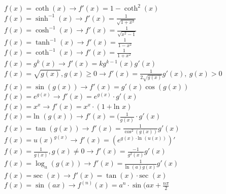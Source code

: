 \documentclass[12pt]{article}
\def\sec{\text{sec\ }} %
\def\ln{\text{ln\ }} %
\begin{document}
\begin{flushleft}
	\textbullet \quad $\displaystyle f(x) = \coth(x) \rightarrow f'(x) = 1-\coth ^2(x) $ \linebreak 
	\textbullet \quad $\displaystyle f(x) = \sinh ^{-1} (x) \rightarrow f'(x) = \frac{1}{\sqrt{1+x^2}} $ \linebreak 
	\textbullet \quad $\displaystyle f(x) = \cosh ^{-1} (x) \rightarrow f'(x) = \frac{1}{\sqrt{x^2 -1}} $ \linebreak 
	\textbullet \quad $\displaystyle f(x) = \tanh ^{-1} (x) \rightarrow f'(x) = \frac{1}{1-x^2} $ \linebreak 
	\textbullet \quad $\displaystyle f(x) = \coth ^{-1} (x) \rightarrow f'(x) = \frac{1}{1+x^2} $ \linebreak 
	\textbullet \quad $\displaystyle f(x) = g^k(x) \rightarrow f'(x) = k g^{k-1}(x) g'(x)$ \linebreak 
	\textbullet \quad $\displaystyle f(x) = \sqrt{g(x)}, g(x) \geq 0 \rightarrow f'(x) = \frac{1}{2\sqrt{g(x)}} g'(x), \ g(x) > 0 $ \linebreak 
	\textbullet \quad $\displaystyle f(x) = \sin (g(x)) \rightarrow f'(x) = g'(x) \cos (g(x)) $ \linebreak 
	\textbullet \quad $\displaystyle f(x) = e^{g(x)} \rightarrow f'(x) = e^{g(x)} \cdot g'(x) $ \linebreak 
	\textbullet \quad $\displaystyle f(x) = x^x \rightarrow f'(x) = x^x \cdot (1 + \ln x) $ \linebreak 
	\textbullet \quad $\displaystyle f(x) = \ln (g(x)) \rightarrow f'(x) = (\frac{1}{g(x)} \cdot g'(x)$ \linebreak 
	\textbullet \quad $\displaystyle f(x) = \tan (g(x)) \rightarrow f'(x) = \frac{1}{\cos ^2(g(x))} g'(x) $ \linebreak 
	\textbullet \quad $\displaystyle f(x) = u(x)^{g(x)} \rightarrow f'(x) = \left( e^{g(x) \cdot \ln (u(x))} \right)' $ \linebreak 
	\textbullet \quad $\displaystyle f(x) = \frac{1}{g(x)}, g(x) \neq 0 \rightarrow f'(x) = \frac{-1}{g^2(x)} g'(x) $ \linebreak 
	\textbullet \quad $\displaystyle f(x) = \log_a(g(x)) \rightarrow f'(x) = \frac{1}{\ln (a) g(x)} g'(x)$ \linebreak 
	\textbullet \quad $\displaystyle f(x) = \sec (x) \rightarrow f'(x) = \tan (x) \cdot \sec (x) $ \linebreak 
	\textbullet \quad $\displaystyle f(x) = \sin (ax) \rightarrow f^{(n)}(x) = a^n \cdot \sin (ax + \frac{n\pi}{2} $ \linebreak 

\end{flushleft}
\end{document}
